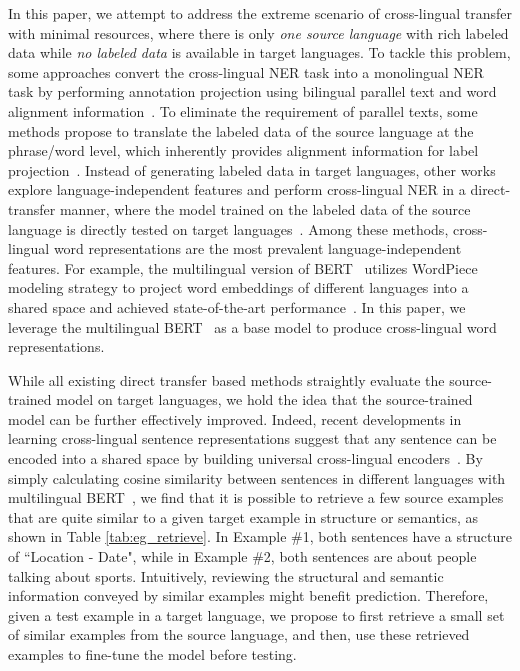 \documentclass[letterpaper]{article} \usepackage{aaai20}  \usepackage{times}  \usepackage{helvet} \usepackage{courier}  \usepackage[hyphens]{url}  \usepackage{graphicx} \urlstyle{rm} \def\UrlFont{\rm}  \usepackage{graphicx}
\begin{document}
In this paper, we attempt to address the extreme scenario of cross-lingual transfer with minimal resources, where there is only \textit{one source language} with rich labeled data while \textit{no labeled data} is available in target languages. 
To tackle this problem, some approaches convert the cross-lingual NER task into a monolingual NER task by performing annotation projection using bilingual parallel text and word alignment information~\cite{ni2017weakly}. To eliminate the requirement of parallel texts, some methods propose to translate the labeled data of the source language at the phrase/word level, which inherently provides alignment information for label projection~\cite{mayhew2017cheap,xie2018neural}. 
Instead of generating labeled data in target languages, other works explore language-independent features and perform cross-lingual NER in a direct-transfer manner, where the model trained on the labeled data of the source language is directly tested on target languages~\cite{tsai2016cross,ni2017weakly}. 
Among these methods, cross-lingual word representations are the most prevalent language-independent features. For example, the multilingual version of BERT~\cite{devlin2019bert} utilizes WordPiece modeling strategy to project word embeddings of different languages into a shared space and achieved state-of-the-art performance~\cite{wu2019beto}. 
In this paper, we leverage the multilingual BERT~\cite{devlin2019bert} as a base model to produce cross-lingual word representations.

While all existing direct transfer based methods straightly evaluate the source-trained model on target languages, we hold the idea that the source-trained model can be further effectively improved. Indeed, recent developments in learning cross-lingual sentence representations suggest that any sentence can be encoded into a shared space by building universal cross-lingual encoders~\cite{wu2019beto,lample2019cross}. 
By simply calculating cosine similarity between sentences in different languages with multilingual BERT~\cite{devlin2019bert}, we find that it is possible to retrieve a few source examples that are quite similar to a given target example in structure or semantics, as shown in Table \ref{tab:eg_retrieve}. 
In Example \#1, both sentences have a structure of ``Location - Date", while in Example \#2, both sentences are about people talking about sports. 
Intuitively, reviewing the structural and semantic information conveyed by similar examples might benefit prediction. 
Therefore, given a test example in a target language, we propose to first retrieve a small set of similar examples from the source language, and then, use these retrieved examples to fine-tune the model before testing.
\end{document}
